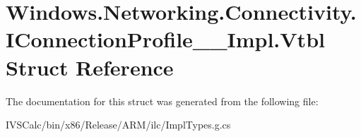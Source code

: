 \hypertarget{struct_windows_1_1_networking_1_1_connectivity_1_1_i_connection_profile_____impl_1_1_vtbl}{}\section{Windows.\+Networking.\+Connectivity.\+I\+Connection\+Profile\+\_\+\+\_\+\+Impl.\+Vtbl Struct Reference}
\label{struct_windows_1_1_networking_1_1_connectivity_1_1_i_connection_profile_____impl_1_1_vtbl}


The documentation for this struct was generated from the following file\+:\begin{DoxyCompactItemize}
\item 
I\+V\+S\+Calc/bin/x86/\+Release/\+A\+R\+M/ilc/Impl\+Types.\+g.\+cs\end{DoxyCompactItemize}
